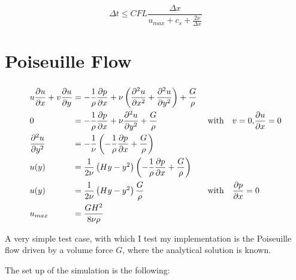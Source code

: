 \documentclass[
	pdftex,             %
	12pt,				%
	a4paper,		   	%
	english,				%
	oneside,			%
]{article}
\begin{document}
\begin{equation}
\Delta t \leq CFL \dfrac{\Delta x}{u_{max} + c_s + \frac{2 \nu}{\Delta x}}
\end{equation}

\clearpage

\section{Poiseuille Flow}

\begin{eqnarray}
\begin{split}
\arraycolsep=1.4pt\def\arraystretch{2.2}
\begin{array}{lcll}
u\dfrac{\partial u}{\partial x} + v\dfrac{\partial u}{\partial y}
&=& 
-\dfrac{1}{\rho} \dfrac{\partial p}{\partial x}
+ \nu \left( \dfrac{\partial^2 u}{\partial x^2} + \dfrac{\partial^2 u}{\partial y^2} \right)
+ \dfrac{G}{\rho}&
\\
0 &=& -\dfrac{1}{\rho} \dfrac{\partial p}{\partial x} + \nu \dfrac{\partial^2 u}{\partial y^2} + \dfrac{G}{\rho}
&\textnormal{~~~with~~~} v = 0 \textnormal{,} \dfrac{\partial u}{\partial x} = 0
\\
\dfrac{\partial^2 u}{\partial y^2} 
&=&
-\dfrac{1}{\nu} \left( -\dfrac{1}{\rho} \dfrac{\partial p}{\partial x} + \dfrac{G}{\rho}\right)&
\\
u(y) &=& \dfrac{1}{2\nu} \left( Hy - y^2 \right) 
         \left( -\dfrac{1}{\rho} \dfrac{\partial p}{\partial x} + \dfrac{G}{\rho} \right)&
\\
u(y) &=& \dfrac{1}{2\nu} \left( Hy - y^2 \right) \dfrac{G}{\rho}
&\textnormal{~~~with~~~}
\dfrac{\partial p}{\partial x} = 0
\\
u_{max} &=& \dfrac{GH^2}{8\nu\rho}&
\end{array}
\end{split}
\end{eqnarray}

A very simple test case, with which I test my implementation is the Poiseuille flow driven by a volume force $G$, where the analytical solution is known.

The set up of the simulation is the following:
\end{document}
